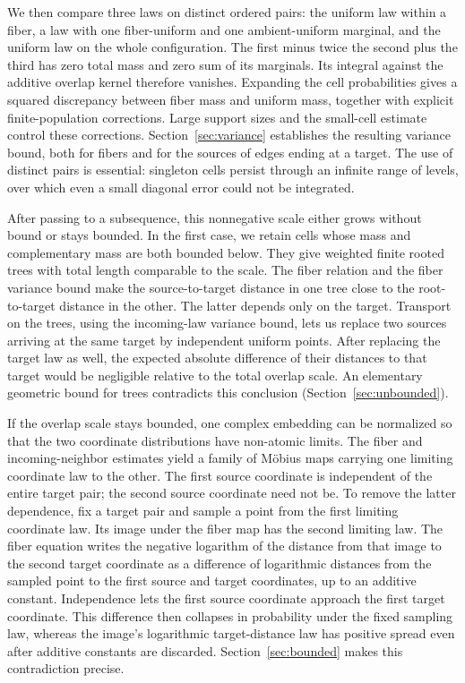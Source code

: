 We then compare three laws on distinct ordered pairs: the uniform law
within a fiber, a law with one fiber-uniform and one ambient-uniform
marginal, and the uniform law on the whole configuration. The first
minus twice the second plus the third has zero total mass and zero
sum of its marginals. Its integral against the additive overlap kernel
therefore vanishes. Expanding the cell probabilities gives a squared
discrepancy between fiber mass and uniform mass, together with explicit
finite-population corrections. Large support sizes and the small-cell
estimate control these corrections. Section~\ref{sec:variance}
establishes the resulting variance bound, both for fibers and for
the sources of edges ending at a target. The use of distinct pairs is
essential: singleton cells persist through an infinite range of levels,
over which even a small diagonal error could not be integrated.

After passing to a subsequence, this nonnegative scale either grows
without bound or stays bounded. In the first case, we retain cells whose
mass and complementary mass are both bounded below. They give weighted finite rooted
trees with total length comparable to the scale.
The fiber relation and the fiber variance bound make the source-to-target distance in one tree
close to the root-to-target distance in the other. The latter depends
only on the target. Transport on the trees, using the incoming-law
variance bound, lets us replace two sources arriving at the same target
by independent uniform points. After replacing the target law as well,
the expected absolute difference of their distances to that target
would be negligible relative to the total overlap scale. An elementary
geometric bound for trees contradicts this conclusion
(Section~\ref{sec:unbounded}).

If the overlap scale stays bounded, one complex embedding can be
normalized so that the two coordinate distributions have non-atomic
limits. The fiber and incoming-neighbor estimates yield a family of
M\"obius maps carrying one limiting coordinate law to the other. The
first source coordinate is independent of the entire target pair;
the second source coordinate need not be. To remove the latter
dependence, fix a target pair and sample a point from the first limiting
coordinate law. Its image under the fiber map has the second limiting
law. The fiber equation writes the negative logarithm of the distance
from that image to the second target coordinate as a difference of
logarithmic distances from the sampled point to the first source and
target coordinates, up to an additive constant. Independence lets the
first source coordinate approach the first target coordinate. This
difference then collapses in probability under the fixed sampling law,
whereas the image's logarithmic target-distance law has positive spread
even after additive constants are discarded.
Section~\ref{sec:bounded} makes this contradiction precise.

